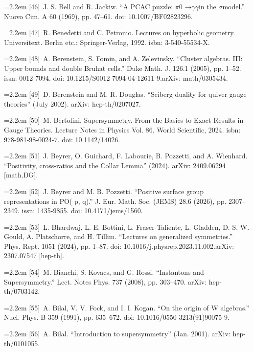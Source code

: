 \noindent\hangindent=2.2em [46]\ J. S. Bell and R. Jackiw. “A PCAC puzzle: $\pi$0 →$\gamma$$\gamma$in the $\sigma$model.” Nuovo Cim. A 60 (1969), pp. 47--61. doi: 10.1007/BF02823296.\par
\noindent\hangindent=2.2em [47]\ R. Benedetti and C. Petronio. Lectures on hyperbolic geometry. Universitext. Berlin etc.: Springer-Verlag, 1992. isbn: 3-540-55534-X.\par
\noindent\hangindent=2.2em [48]\ A. Berenstein, S. Fomin, and A. Zelevinsky. “Cluster algebras. III: Upper bounds and double Bruhat cells.” Duke Math. J. 126.1 (2005), pp. 1--52. issn: 0012-7094. doi: 10.1215/S0012-7094-04-12611-9.arXiv: math/0305434.\par
\noindent\hangindent=2.2em [49]\ D. Berenstein and M. R. Douglas. “Seiberg duality for quiver gauge theories” (July 2002). arXiv: hep-th/0207027.\par
\noindent\hangindent=2.2em [50]\ M. Bertolini. Supersymmetry. From the Basics to Exact Results in Gauge Theories. Lecture Notes in Physics Vol. 86. World Scientific, 2024. isbn: 978-981-98-0024-7. doi: 10.1142/14026.\par
\noindent\hangindent=2.2em [51]\ J. Beyrer, O. Guichard, F. Labourie, B. Pozzetti, and A. Wienhard. “Positivity, cross-ratios and the Collar Lemma” (2024). arXiv: 2409.06294 [math.DG].\par
\noindent\hangindent=2.2em [52]\ J. Beyrer and M. B. Pozzetti. “Positive surface group representations in PO( p, q).” J. Eur. Math. Soc. (JEMS) 28.6 (2026), pp. 2307--2349. issn: 1435-9855. doi: 10.4171/jems/1560.\par
\noindent\hangindent=2.2em [53]\ L. Bhardwaj, L. E. Bottini, L. Fraser-Taliente, L. Gladden, D. S. W. Gould, A. Platschorre, and H. Tillim. “Lectures on generalized symmetries.” Phys. Rept. 1051 (2024), pp. 1--87. doi: 10.1016/j.physrep.2023.11.002.arXiv: 2307.07547 [hep-th].\par
\noindent\hangindent=2.2em [54]\ M. Bianchi, S. Kovacs, and G. Rossi. “Instantons and Supersymmetry.” Lect. Notes Phys. 737 (2008), pp. 303--470. arXiv: hep-th/0703142.\par
\noindent\hangindent=2.2em [55]\ A. Bilal, V. V. Fock, and I. I. Kogan. “On the origin of W algebras.” Nucl. Phys. B 359 (1991), pp. 635--672. doi: 10.1016/0550-3213(91)90075-9.\par
\noindent\hangindent=2.2em [56]\ A. Bilal. “Introduction to supersymmetry” (Jan. 2001). arXiv: hep-th/0101055.\par
$$

